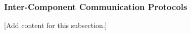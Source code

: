 
\subsubsection{Inter-Component Communication Protocols}
\label{subsubsec:design_2_4_intercomponent_protocols}

[Add content for this subsection.]
